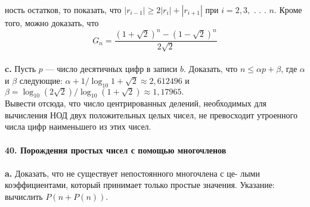 ность остатков, то показать, что $|r_{i-1}|\geq2|r_i|+|r_{i+1}|$ при $i = 2,3,$ . . . $n.$\linebreak
Кроме того, можно доказать, что
\begin{equation*}
G_n=\frac{(1+\sqrt{2})^n-(1-\sqrt{2})^n}{2\sqrt{2}}
\end{equation*}\\
\hspace*{10pt}\textbf{c.}  Пусть $p$ — число десятичных цифр в записи $b$. Доказать, что\linebreak
$n\leq \alpha p +\beta $, где $\alpha$ и $\beta$ следующие: $\alpha+1/\log_{10}{1+\sqrt{2}}\approx2,612496$ и\linebreak
$\beta = \log_{10}{(2\sqrt{2})}/\log_{10}{(1+\sqrt{2})} \approx 1,17965.$\\
\hspace*{10pt} Вывести отсюда, что число центрированных делений, необходимых\linebreak
для вычисления НОД двух положительных целых чисел, не превосходит\linebreak
утроенного числа цифр наименьшего из этих чисел.
\\
\\
\noindent\textbf{40. Порождения простых чисел с помощью многочленов}\\\\
\hspace*{10pt}\textbf{a.} Доказать, что не существует непостоянного многочлена с це-\linebreak
лыми коэффициентами, который принимает только простые значения.\linebreak
Указание: вычислить $P(n+P(n))$.\pagebreak


